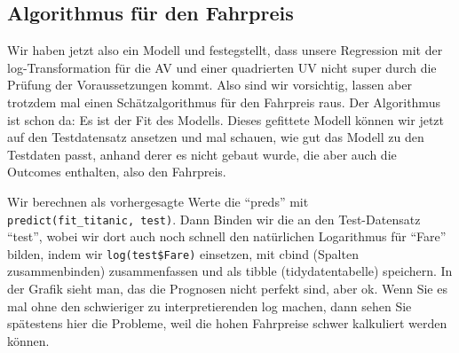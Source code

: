 \documentclass[
  10pt,
  letterpaper,
  a4paper, twoside]{scrreprt}
\begin{document}
\subsection{Algorithmus für den
Fahrpreis}\label{algorithmus-fuxfcr-den-fahrpreis}

Wir haben jetzt also ein Modell und festegstellt, dass unsere Regression
mit der log-Transformation für die AV und einer quadrierten UV nicht
super durch die Prüfung der Voraussetzungen kommt. Also sind wir
vorsichtig, lassen aber trotzdem mal einen Schätzalgorithmus für den
Fahrpreis raus. Der Algorithmus ist schon da: Es ist der Fit des
Modells. Dieses gefittete Modell können wir jetzt auf den Testdatensatz
ansetzen und mal schauen, wie gut das Modell zu den Testdaten passt,
anhand derer es nicht gebaut wurde, die aber auch die Outcomes
enthalten, also den Fahrpreis.

Wir berechnen als vorhergesagte Werte die \enquote{preds} mit
\texttt{predict(fit\_titanic,\ test)}. Dann Binden wir die an den
Test-Datensatz \enquote{test}, wobei wir dort auch noch schnell den
natürlichen Logarithmus für \enquote{Fare} bilden, indem wir
\texttt{log(test\$Fare)} einsetzen, mit cbind (Spalten zusammenbinden)
zusammenfassen und als tibble (tidydatentabelle) speichern. In der
Grafik sieht man, das die Prognosen nicht perfekt sind, aber ok. Wenn
Sie es mal ohne den schwieriger zu interpretierenden log machen, dann
sehen Sie spätestens hier die Probleme, weil die hohen Fahrpreise schwer
kalkuliert werden können.
\end{document}
